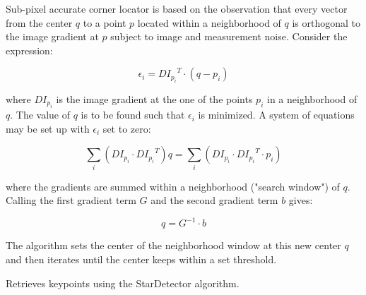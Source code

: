 Sub-pixel accurate corner locator is based on the observation that every vector from the center $q$ to a point $p$ located within a neighborhood of $q$ is orthogonal to the image gradient at $p$ subject to image and measurement noise. Consider the expression:

\[
\epsilon_i = {DI_{p_i}}^T \cdot (q - p_i)
\]

where ${DI_{p_i}}$ is the image gradient at the one of the points $p_i$ in a neighborhood of $q$. The value of $q$ is to be found such that $\epsilon_i$ is minimized. A system of equations may be set up with $\epsilon_i$ set to zero:

\[
\sum_i(DI_{p_i} \cdot {DI_{p_i}}^T) q = \sum_i(DI_{p_i} \cdot {DI_{p_i}}^T \cdot p_i)
\]

where the gradients are summed within a neighborhood ("search window") of $q$. Calling the first gradient term $G$ and the second gradient term $b$ gives:

\[
q = G^{-1} \cdot b
\]

The algorithm sets the center of the neighborhood window at this new center $q$ and then iterates until the center keeps within a set threshold.

Retrieves keypoints using the StarDetector algorithm.


